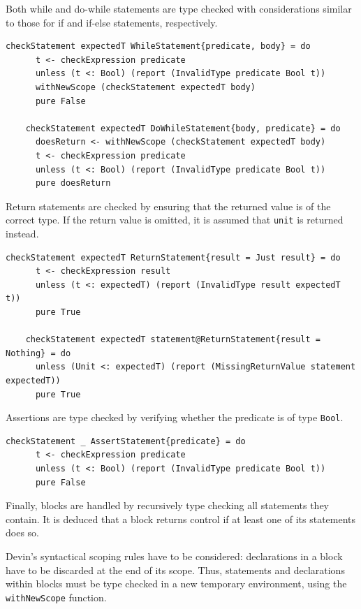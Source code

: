 \documentclass[UdineBachThesis,american,11pt]{PhdThesis}
\begin{document}
  Both while and do-while statements are type checked with considerations
  similar to those for if and if-else statements, respectively.

  \begin{Verbatim}[gobble=4,fontsize=\small]
    checkStatement expectedT WhileStatement{predicate, body} = do
      t <- checkExpression predicate
      unless (t <: Bool) (report (InvalidType predicate Bool t))
      withNewScope (checkStatement expectedT body)
      pure False

    checkStatement expectedT DoWhileStatement{body, predicate} = do
      doesReturn <- withNewScope (checkStatement expectedT body)
      t <- checkExpression predicate
      unless (t <: Bool) (report (InvalidType predicate Bool t))
      pure doesReturn
  \end{Verbatim}

  Return statements are checked by ensuring that the returned value is of the
  correct type. If the return value is omitted, it is assumed that
  \mbox{\texttt{unit}} is returned instead.

  \begin{Verbatim}[gobble=4,fontsize=\small]
    checkStatement expectedT ReturnStatement{result = Just result} = do
      t <- checkExpression result
      unless (t <: expectedT) (report (InvalidType result expectedT t))
      pure True

    checkStatement expectedT statement@ReturnStatement{result = Nothing} = do
      unless (Unit <: expectedT) (report (MissingReturnValue statement expectedT))
      pure True
  \end{Verbatim}

  \pagebreak

  Assertions are type checked by verifying whether the predicate is of type
  \mbox{\texttt{Bool}}.

  \begin{Verbatim}[gobble=4,fontsize=\small]
    checkStatement _ AssertStatement{predicate} = do
      t <- checkExpression predicate
      unless (t <: Bool) (report (InvalidType predicate Bool t))
      pure False
  \end{Verbatim}

  Finally, blocks are handled by recursively type checking all statements they
  contain. It is deduced that a block returns control if at least one of its
  statements does so.

  Devin's syntactical scoping rules have to be considered: declarations in a
  block have to be discarded at the end of its scope. Thus, statements and
  declarations within blocks must be type checked in a new temporary
  environment, using the \mbox{\texttt{withNewScope}} function.
\end{document}

